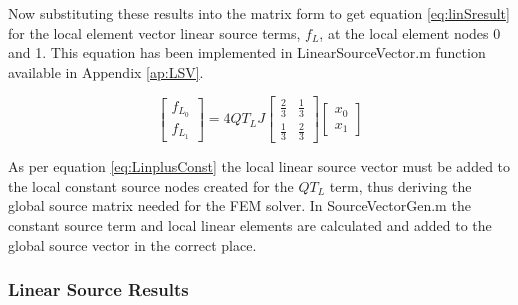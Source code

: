 \documentclass[11pt]{article}
\begin{document}
Now substituting these results into the matrix form to get equation \ref{eq:linSresult} for the local element vector linear source terms, $f_L$, at the local element nodes 0 and 1. This equation has been implemented in LinearSourceVector.m function available in Appendix \ref{ap:LSV}.


\begin{equation} \label{eq:linSresult}
\begin{bmatrix}
f_{L_0}\\[1ex]
 f_{L_1} 
\end{bmatrix}
= 4QT_L J 
\begin{bmatrix}
\frac{2}{3} & \frac{1}{3}  \\[1ex]
 \frac{1}{3}  & \frac{2}{3}
\end{bmatrix}
\begin{bmatrix}
x_{0} \\[1ex] x_{1} 
\end{bmatrix}
\end{equation}
\clearpage

As per equation \ref{eq:LinplusConst} the local linear source vector must be added to the local constant source nodes created for the $QT_L$ term, thus deriving the global source matrix needed for the FEM solver. In SourceVectorGen.m the constant source term and local linear elements are calculated and added to the global source vector in the correct place.

\subsubsection{Linear Source Results}
\end{document}
